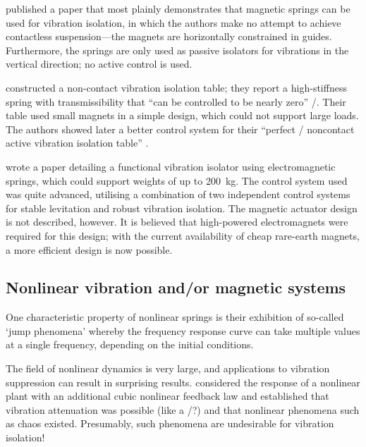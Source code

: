 \textcite{puppin2002} published a paper that most plainly demonstrates that magnetic springs can be used for vibration isolation, in which the authors make no attempt to achieve contactless suspension—the magnets are horizontally constrained in guides.
Furthermore, the springs are only used as passive isolators for vibrations in the vertical direction; no active control is used.

\textcite{nagaya1993} constructed a non-contact vibration isolation table; they report a high-stiffness spring with transmissibility that \enquote{can be controlled to be nearly zero} \sic/.
Their table used small magnets in a simple design, which could not support large loads.
The authors showed later a better control system for their \enquote{perfect \sic/
noncontact active vibration isolation table} \cite{nagaya1995a}.

\textcite{watanabe1996} wrote a paper detailing a functional vibration isolator using electromagnetic springs, which could support weights of up to
\SI{200}{kg}.
The control system used was quite advanced, utilising a combination of two independent control systems for stable levitation and robust vibration isolation.
The magnetic actuator design is not described, however.
It is believed that high-powered electromagnets were required for this design; with the current availability of cheap rare-earth magnets, a more efficient design is now possible.



\subsection{Nonlinear vibration and/or magnetic systems}

One characteristic property of nonlinear springs is their exhibition of so-called `jump phenomena' whereby the frequency response curve can take multiple values at a single frequency, depending on the initial conditions.

The field of nonlinear dynamics is very large, and applications to vibration suppression can result in surprising results.
\textcite{oueini1999} considered the response of a nonlinear plant with an additional cubic nonlinear feedback law and established that vibration attenuation was possible (like a \vibneut/?) and that nonlinear phenomena such as chaos existed.
Presumably, such phenomena are undesirable for vibration isolation!

